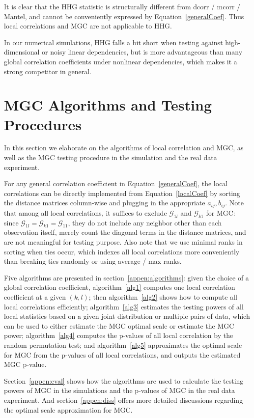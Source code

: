 \documentclass[11pt]{article}
\newcommand{\G}{\mathcal{G}}
\begin{document}
It is clear that the HHG statistic is structurally different from dcorr / mcorr / Mantel, and cannot be conveniently expressed by Equation~\ref{generalCoef}. Thus local correlations and MGC are not applicable to HHG.

In our numerical simulations, HHG falls a bit short when testing against high-dimensional or noisy linear dependencies, but is more advantageous than many global correlation coefficients under nonlinear dependencies, which makes it a strong competitor in general. 

\section{MGC Algorithms and Testing Procedures}
\label{appen:tests}
In this section we elaborate on the algorithms of local correlation and MGC, as well as the MGC testing procedure in the simulation and the real data experiment. 

For any general correlation coefficient in Equation~\ref{generalCoef}, the local correlations can be directly implemented from Equation~\ref{localCoef} by sorting the distance matrices column-wise and plugging in the appropriate $a_{ij}, b_{ij}$. Note that among all local correlations, it suffices to exclude $\G_{1l}$ and $\G_{k1}$ for MGC: since $\G_{1l}=\G_{k1}=\G_{11}$, they do not include any neighbor other than each observation itself, merely count the diagonal terms in the distance matrices, and are not meaningful for testing purpose. Also note that we use minimal ranks in sorting when ties occur, which indexes all local correlations more conveniently than breaking ties randomly or using average / max ranks.

Five algorithms are presented in section~\ref{appen:algorithms}: given the choice of a global correlation coefficient, algorithm~\ref{alg1} computes one local correlation coefficient at a given $(k,l)$; then algorithm~\ref{alg2} shows how to compute all local correlations efficiently; algorithm~\ref{alg3} estimates the testing powers of all local statistics based on a given joint distribution or multiple pairs of data, which can be used to either estimate the MGC optimal scale or estimate the MGC power; algorithm~\ref{alg4} computes the p-values of all local correlation by the random permutation test; and algorithm~\ref{alg5} approximates the optimal scale for MGC from the p-values of all local correlations, and outputs the estimated MGC p-value. 

Section~\ref{appen:eval} shows how the algorithms are used to calculate the testing powers of MGC in the simulations and the p-values of MGC in the real data experiment. And section~\ref{appen:diss} offers more detailed discussions regarding the optimal scale approximation for MGC.
\end{document}

